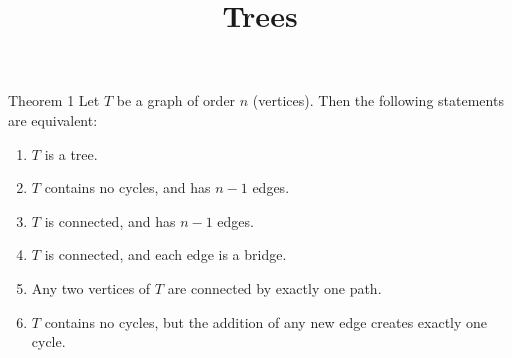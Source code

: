 \documentclass[11pt]{scrartcl}
\title{\color{accentblue}Trees}
\author{}
\date{}
\theoremstyle{plain}
\theoremstyle{remark}
\begin{document}
\maketitle

\begin{thmbox}{Theorem 1}
Let $T$ be a graph of order $n$ (vertices). Then the following statements are equivalent:
\begin{enumerate}
  \item $T$ is a tree.
  \item $T$ contains no cycles, and has $n-1$ edges.
  \item $T$ is connected, and has $n-1$ edges.
  \item $T$ is connected, and each edge is a bridge.
  \item Any two vertices of $T$ are connected by exactly one path.
  \item $T$ contains no cycles, but the addition of any new edge creates exactly one cycle.
\end{enumerate}
\end{thmbox}
\end{document}
